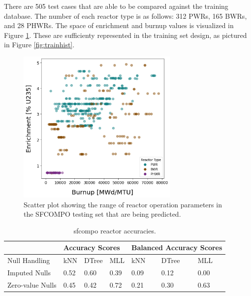 There are 505 test cases that are able to be compared against the training
database.  The number of each reactor type is as follows: 312 \gls{PWR}s, 165
\gls{BWR}s, and 28 \gls{PHWR}s. The space of enrichment and burnup values is
visualized in Figure \ref{fig:sfcoscatter}. These are sufficienty represented
in the training set design, as pictured in Figure \ref{fig:trainhist}.

\begin{figure}[!ht]
    \centering
    \includegraphics[width=0.7\textwidth]{./chapters/exp1/sfcompo_scatter_viz.png}
    \caption{Scatter plot showing the range of reactor operation parameters in 
             the \gls{SFCOMPO} testing set that are being predicted.}
    \label{fig:sfcoscatter}
\end{figure}



\begin{table}[!ht]
  \centering
  \begin{tabular}{@{}l|lll|lll@{}}
  \toprule
                   & \multicolumn{3}{l|}{Accuracy Scores} & \multicolumn{3}{l}{Balanced Accuracy Scores} \\ \toprule
  Null Handling    & kNN        & DTree      & MLL       & kNN           & DTree         & MLL           \\ \midrule
  Imputed Nulls    & 0.52       & 0.60       & 0.39      & 0.09          & 0.12          & 0.00          \\
  Zero-value Nulls & 0.45       & 0.42       & 0.72      & 0.21          & 0.30          & 0.63          \\ \bottomrule
  \end{tabular}
  \caption{sfcompo reactor accuracies.}
  \label{tbl:sfcorxtr}
\end{table}

